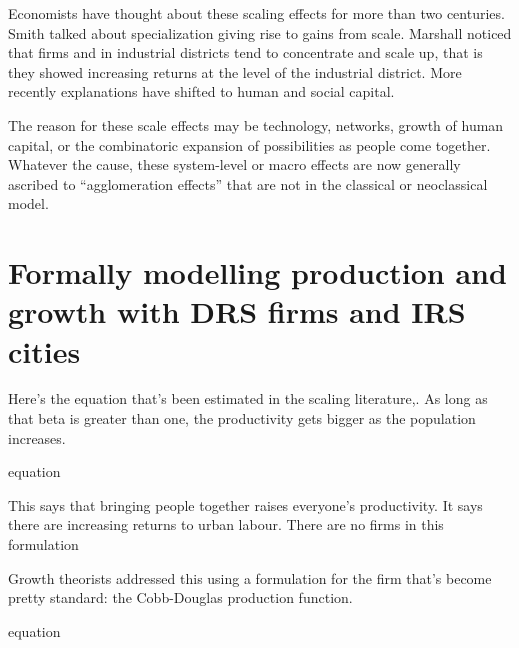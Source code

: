 \documentclass[]{article}
\begin{document}
Economists have thought about these scaling effects for more than two centuries. Smith talked about specialization giving rise to gains from scale. Marshall noticed that firms and in industrial districts tend to concentrate and scale up, that is they showed increasing returns at the level of the industrial district. More recently explanations have shifted to human and social capital.

The reason for these scale effects may be technology, networks, growth of human capital, or the combinatoric expansion of possibilities as people come together. 
Whatever the cause, these system-level or macro effects are now generally ascribed to ``agglomeration effects''  that are not in the classical or neoclassical model.  







\section{Formally modelling production and growth with DRS firms and IRS cities}
Here’s the equation that’s been estimated in the scaling literature,. As long as that beta is greater than one, the productivity gets bigger as the population increases.


\hspace{4cm} equation

\noindent This says that bringing people together raises everyone’s productivity. It says there are increasing returns to urban labour. There are no firms in this formulation

Growth theorists addressed this using a formulation for the firm that’s become pretty standard: the Cobb-Douglas production function.

\hspace{4cm} equation
\end{document}
